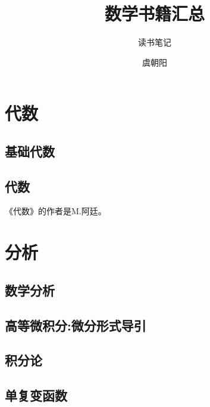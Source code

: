 \documentclass[cn,11pt,chinese]{elegantbook}
\title{数学书籍汇总}
\subtitle{读书笔记}
\author{虞朝阳}
\institute{西北工业大学}
\numberwithin{equation}{section}
\begin{document}
\maketitle



\tableofcontents
\mainmatter
\hypersetup{pageanchor=true}

\part{代数}



\chapter{基础代数}


\chapter{代数}
 《代数》的作者是M.阿廷。

\part{分析}
\chapter{数学分析}


\chapter{高等微积分:微分形式导引}

\chapter{积分论}

\chapter{单复变函数}


% 

\appendix
\end{document}
